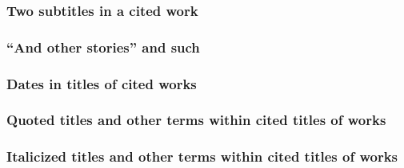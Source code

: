 \documentclass[11pt,letterpaper,oneside]{article}
\begin{document}
\begin{citebib}
\item \cite{gladwell2013}
\end{citebib}

\subsubsection{Two subtitles in a cited work}

\begin{citebib}
\item \cite{sereny1999}
\end{citebib}

\setcounter{subsubsection}{91}
\subsubsection{``And other stories'' and such}

\begin{citebib}
\item \cite[104]{maclean1976}
\end{citebib}

\subsubsection{Dates in titles of cited works}

\begin{citebib}
\item \cite{beiser2014}
\end{citebib}

\subsubsection{Quoted titles and other terms within cited titles of works}

\begin{citebib}
\item \cite{levitt2014}
\item \cite{mchugh1980}
\end{citebib}

\subsubsection{Italicized titles and other terms within cited titles of works}
\end{document}
